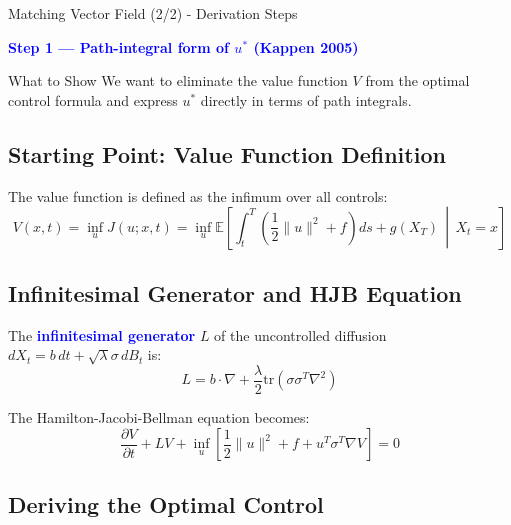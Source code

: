 \documentclass[aspectratio=169,xcolor=dvipsnames]{beamer}
\begin{document}
\begin{frame}[allowframebreaks]{Matching Vector Field (2/2) - Derivation Steps}
    \vspace{-0.3cm}
    
    \begin{center}
        \Large\textcolor{blue}{\textbf{Step 1 — Path-integral form of $u^*$ (Kappen 2005)}}
    \end{center}
    
    \vspace{0.3cm}
    
    \begin{block}{What to Show}
        We want to eliminate the value function $V$ from the optimal control formula and express $u^*$ directly in terms of path integrals.
    \end{block}
    
    \vspace{0.5cm}
    
    \subsection*{Starting Point: Value Function Definition}
    
    The value function is defined as the infimum over all controls:
    $$V(x,t) = \inf_u J(u; x,t) = \inf_u \mathbb{E}\left[\int_t^T \left(\frac{1}{2}\|u\|^2 + f\right) ds + g(X_T) \,\middle|\, X_t = x\right]$$
    
    \vspace{0.5cm}
    
    \subsection*{Infinitesimal Generator and HJB Equation}
    
    The \textcolor{blue}{\textbf{infinitesimal generator}} $L$ of the uncontrolled diffusion $dX_t = b \, dt + \sqrt{\lambda} \sigma \, dB_t$ is:
    $$L = b \cdot \nabla + \frac{\lambda}{2} \text{tr}(\sigma \sigma^T \nabla^2)$$
    
    The Hamilton-Jacobi-Bellman equation becomes:
    $$\frac{\partial V}{\partial t} + LV + \inf_u \left[\frac{1}{2}\|u\|^2 + f + u^T \sigma^T \nabla V\right] = 0$$
    
    \vspace{0.5cm}
    
    \subsection*{Deriving the Optimal Control}
    

\end{frame}
\end{document}
